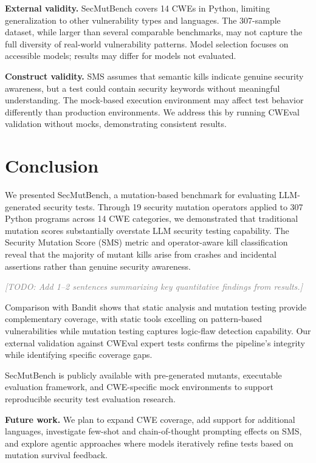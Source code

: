 \documentclass[sigconf,review,anonymous]{acmart}
\newcommand{\todo}[1]{\textcolor{gray}{\textit{[TODO: #1]}}}
\begin{document}
\textbf{External validity.} SecMutBench covers 14 CWEs in Python, limiting generalization to other vulnerability types and languages. The 307-sample dataset, while larger than several comparable benchmarks, may not capture the full diversity of real-world vulnerability patterns. Model selection focuses on accessible models; results may differ for models not evaluated.

\textbf{Construct validity.} SMS assumes that semantic kills indicate genuine security awareness, but a test could contain security keywords without meaningful understanding. The mock-based execution environment may affect test behavior differently than production environments. We address this by running CWEval validation without mocks, demonstrating consistent results.


\section{Conclusion}\label{sec:conclusion}

We presented SecMutBench, a mutation-based benchmark for evaluating LLM-generated security tests. Through 19 security mutation operators applied to 307 Python programs across 14 CWE categories, we demonstrated that traditional mutation scores substantially overstate LLM security testing capability. The Security Mutation Score (SMS) metric and operator-aware kill classification reveal that the majority of mutant kills arise from crashes and incidental assertions rather than genuine security awareness.

\todo{Add 1--2 sentences summarizing key quantitative findings from results.}

Comparison with Bandit shows that static analysis and mutation testing provide complementary coverage, with static tools excelling on pattern-based vulnerabilities while mutation testing captures logic-flaw detection capability. Our external validation against CWEval expert tests confirms the pipeline's integrity while identifying specific coverage gaps.

SecMutBench is publicly available with pre-generated mutants, executable evaluation framework, and CWE-specific mock environments to support reproducible security test evaluation research.

\textbf{Future work.} We plan to expand CWE coverage, add support for additional languages, investigate few-shot and chain-of-thought prompting effects on SMS, and explore agentic approaches where models iteratively refine tests based on mutation survival feedback.


\balance


\end{document}
